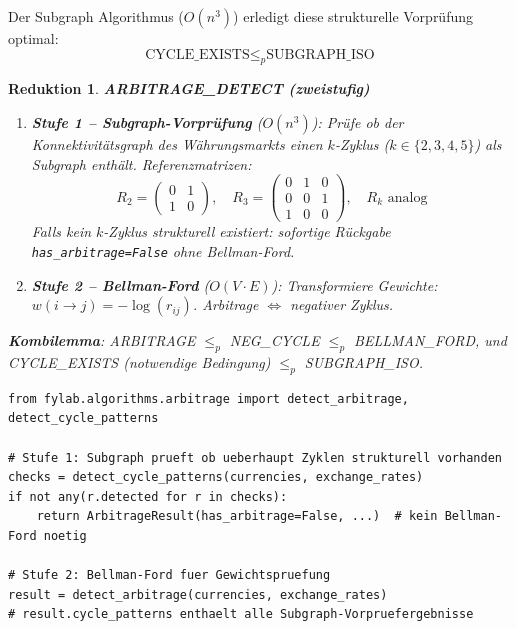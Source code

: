 \documentclass[a4paper,12pt]{article}
\newtheorem{reduktion}{Reduktion}
\begin{document}
Der Subgraph Algorithmus (\(O(n^3)\)) erledigt diese strukturelle
Vorprüfung optimal:
\[
    \text{CYCLE\_EXISTS} \leq_p \text{SUBGRAPH\_ISO}
\]

\begin{reduktion}
    \textbf{ARBITRAGE\_DETECT (zweistufig)}

    \begin{enumerate}
        \item \textbf{Stufe 1 -- Subgraph-Vorprüfung} ($O(n^3)$):
        Prüfe ob der Konnektivitätsgraph des Währungsmarkts einen
        $k$-Zyklus ($k \in \{2,3,4,5\}$) als Subgraph enthält.
        Referenzmatrizen:
        \[
            R_2 = \begin{pmatrix}0&1\\1&0\end{pmatrix}, \quad
            R_3 = \begin{pmatrix}0&1&0\\0&0&1\\1&0&0\end{pmatrix}, \quad
            R_k \text{ analog}
        \]
        Falls \emph{kein} $k$-Zyklus strukturell existiert:
        sofortige Rückgabe \texttt{has\_arbitrage=False} ohne Bellman-Ford.

        \item \textbf{Stufe 2 -- Bellman-Ford} ($O(V \cdot E)$):
        Transformiere Gewichte: $w(i{\to}j) = -\log(r_{ij})$.
        Arbitrage $\Leftrightarrow$ negativer Zyklus.
    \end{enumerate}

    \textbf{Kombilemma}: ARBITRAGE $\leq_p$ NEG\_CYCLE $\leq_p$ BELLMAN\_FORD,
    und CYCLE\_EXISTS (notwendige Bedingung) $\leq_p$ SUBGRAPH\_ISO.
\end{reduktion}

\begin{lstlisting}[caption=Zweistufige Arbitrageerkennung]
from fylab.algorithms.arbitrage import detect_arbitrage, detect_cycle_patterns

# Stufe 1: Subgraph prueft ob ueberhaupt Zyklen strukturell vorhanden
checks = detect_cycle_patterns(currencies, exchange_rates)
if not any(r.detected for r in checks):
    return ArbitrageResult(has_arbitrage=False, ...)  # kein Bellman-Ford noetig

# Stufe 2: Bellman-Ford fuer Gewichtspruefung
result = detect_arbitrage(currencies, exchange_rates)
# result.cycle_patterns enthaelt alle Subgraph-Vorpruefergebnisse
\end{lstlisting}
\end{document}

